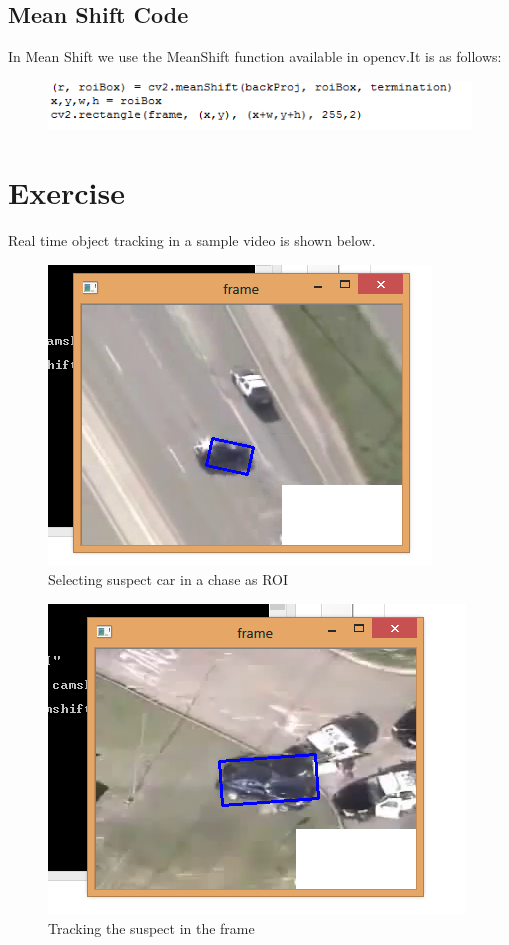 \documentclass[11pt,a4paper]{article}
\begin{document}
	\subsection{Mean Shift Code}
	 In Mean Shift we use the MeanShift function available in opencv.It is as follows:
	  \begin{figure}[h!]
 \includegraphics[scale=0.9]{meanshift.png}
   \centering
  \end{figure}
	\section{Exercise}
	Real time object tracking in a sample video  is shown below.          
	 \begin{figure}[h!]
 \includegraphics[scale=0.9]{Vid_ROI.png}
   \centering
 \caption{Selecting suspect car in a chase as ROI}
  \end{figure}
  \begin{figure}[h!]
 \includegraphics[scale=0.9]{Vid_Det.png}
   \centering
 \caption{Tracking the suspect in the frame}
  \end{figure}
\end{document}
